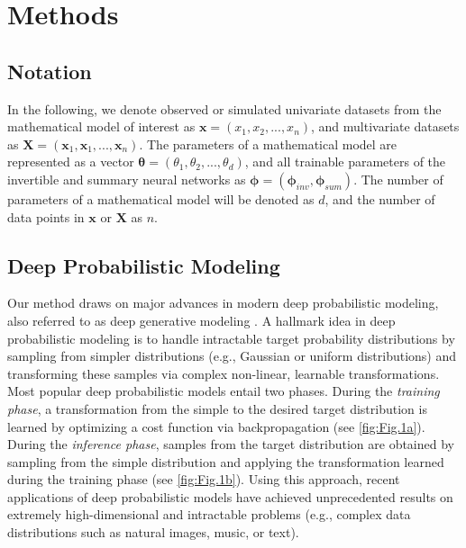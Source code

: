 \documentclass[9pt,twoside,lineno]{pnas-new}
\begin{document}
\section*{Methods}

\subsection*{Notation}

In the following, we denote observed or simulated univariate datasets from the mathematical model of interest as $\boldsymbol{x} = (x_{1}, x_{2},...,x_{n})$, and multivariate datasets as $\boldsymbol{X} = (\boldsymbol{x}_{1}, \boldsymbol{x}_{1},...,\boldsymbol{x}_{n})$. The parameters of a mathematical model are represented as a vector $\boldsymbol{\theta} = (\theta_{1}, \theta_{2},...,\theta_{d})$, and all trainable parameters of the invertible and summary neural networks as $\boldsymbol{\phi} = (\boldsymbol{\phi}_{inv}, \boldsymbol{\phi}_{sum})$. The number of parameters of a mathematical model will be denoted as $d$, and the number of data points in $\boldsymbol{x}$ or $\boldsymbol{X}$ as $n$.

\subsection*{Deep Probabilistic Modeling}

Our method draws on major advances in modern deep probabilistic modeling, also referred to as deep generative modeling \cite{bloem2019probabilistic, kingma2018glow, ardizzone2018analyzing, kingma2014auto}. A hallmark idea in deep probabilistic modeling is to handle intractable target probability distributions by sampling from simpler distributions (e.g., Gaussian or uniform distributions) and transforming these samples via complex non-linear, learnable transformations. Most popular deep probabilistic models entail two phases. During the \textit{training phase}, a transformation from the simple to the desired target distribution is learned by optimizing a cost function via backpropagation (see \autoref{fig:Fig.1a}). During the \textit{inference phase}, samples from the target distribution are obtained by sampling from the simple distribution and applying the transformation learned during the training phase (see \autoref{fig:Fig.1b}). Using this approach, recent applications of deep probabilistic models have achieved unprecedented results on extremely high-dimensional and intractable problems (e.g., complex data distributions such as natural images, music, or text).
\end{document}
